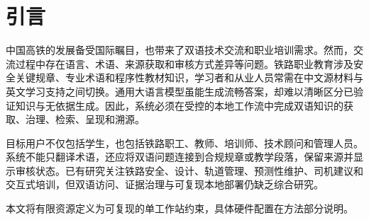 \begin{abstract}

\textbf{研究背景：} 中国高铁技术的国际化应用不断扩大，使双语知识传递与职业培训需求持续增长。现有铁路大语言模型研究往往分别考察领域适配或检索增强生成，对双语模型适配、治理式检索与证据来源之间的协同关系缺少联合验证。因此，本研究以知识增强型大语言模型为核心，构建受治理的双语铁路问答工作流。\textbf{研究方法：} 研究构建专家治理的双语铁路语料，并采用按知识对分组的控制策略，隔离训练、验证与留出评估记录。实验比较 Qwen2.5-7B 和 GLM-4-9B 在双语 QLoRA 适配前后的表现，并以 Qwen3-14B 作为参考模型；在留出双语查询上比较 BM25、BGE-M3 密集检索与倒数排名融合混合检索。模型适配采用独立的双语问答评估，并辅以受控的无检索生成与检索增强生成比较。\textbf{研究结果：} 混合检索在中文和英文上的证据 Recall@5 分别达到 0.715 和 0.708，均高于对应最优单一检索器的 0.690 和 0.685；双语字段索引取得最高的跨语言均衡均值 0.696。Qwen QLoRA 将中文留出问答字符级 F1 从 0.189 提升至 0.398，将英文从 0.437 提升至 0.648，且两项提升经 Holm 校正后仍具有显著性。在混合检索增强生成条件下，其 Answer F1 达到最高的 0.660 和 0.651，高于 Qwen3-14B 参考模型的 0.442 和 0.454。\textbf{研究结论：} 该工作流在本评估条件下改善了双语证据访问和领域问答表现。翻译和引用遵循结果具有任务依赖性，适配输出在实际使用前仍应由作者和铁路领域专家进行人工审核。

\textbf{关键词：} 双语铁路教育；检索增强生成；QLoRA 适配；Web 信息系统

\end{abstract}

\section{引言}

中国高铁的发展备受国际瞩目，也带来了双语技术交流和职业培训需求。然而，交流过程中存在语言、术语、来源获取和审核方式差异等问题。铁路职业教育涉及安全关键规章、专业术语和程序性教材知识，学习者和从业人员常需在中文源材料与英文学习支持之间切换。通用大语言模型虽能生成流畅答案，却难以清晰区分已验证知识与无依据生成。因此，系统必须在受控的本地工作流中完成双语知识的获取、治理、检索、呈现和溯源。

目标用户不仅包括学生，也包括铁路职工、教师、培训师、技术顾问和管理人员。系统不能只翻译术语，还应将双语问题连接到合规规章或教学段落，保留来源并显示审核状态。已有研究关注铁路安全、设计、轨道管理、预测性维护、司机建议和交互式培训，但双语访问、证据治理与可复现本地部署仍缺乏综合研究。

本文将有限资源定义为可复现的单工作站约束，具体硬件配置在方法部分说明。

